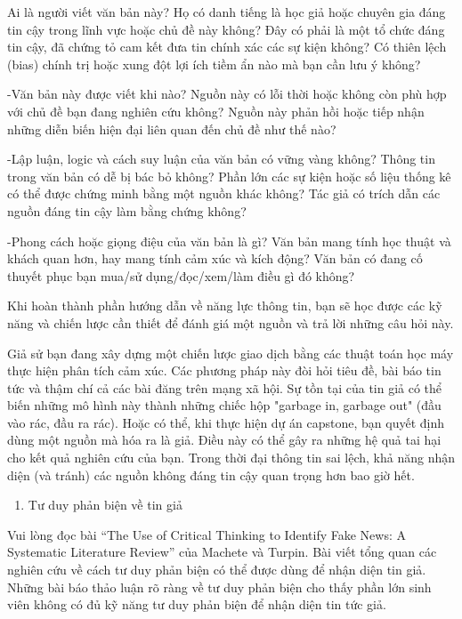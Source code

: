 Ai là người viết văn bản này? Họ có danh tiếng là học giả hoặc chuyên gia đáng tin cậy trong lĩnh vực hoặc chủ đề này không? Đây có phải là một tổ chức đáng tin cậy, đã chứng tỏ cam kết đưa tin chính xác các sự kiện không? Có thiên lệch (bias) chính trị hoặc xung đột lợi ích tiềm ẩn nào mà bạn cần lưu ý không?

-Văn bản này được viết khi nào? Nguồn này có lỗi thời hoặc không còn phù hợp với chủ đề bạn đang nghiên cứu không? Nguồn này phản hồi hoặc tiếp nhận những diễn biến hiện đại liên quan đến chủ đề như thế nào?

-Lập luận, logic và cách suy luận của văn bản có vững vàng không? Thông tin trong văn bản có dễ bị bác bỏ không? Phần lớn các sự kiện hoặc số liệu thống kê có thể được chứng minh bằng một nguồn khác không? Tác giả có trích dẫn các nguồn đáng tin cậy làm bằng chứng không?

-Phong cách hoặc giọng điệu của văn bản là gì? Văn bản mang tính học thuật và khách quan hơn, hay mang tính cảm xúc và kích động? Văn bản có đang cố thuyết phục bạn mua/sử dụng/đọc/xem/làm điều gì đó không?

Khi hoàn thành phần hướng dẫn về năng lực thông tin, bạn sẽ học được các kỹ năng và chiến lược cần thiết để đánh giá một nguồn và trả lời những câu hỏi này.

Giả sử bạn đang xây dựng một chiến lược giao dịch bằng các thuật toán học máy thực hiện phân tích cảm xúc. Các phương pháp này đòi hỏi tiêu đề, bài báo tin tức và thậm chí cả các bài đăng trên mạng xã hội. Sự tồn tại của tin giả có thể biến những mô hình này thành những chiếc hộp "garbage in, garbage out" (đầu vào rác, đầu ra rác). Hoặc có thể, khi thực hiện dự án capstone, bạn quyết định dùng một nguồn mà hóa ra là giả. Điều này có thể gây ra những hệ quả tai hại cho kết quả nghiên cứu của bạn. Trong thời đại thông tin sai lệch, khả năng nhận diện (và tránh) các nguồn không đáng tin cậy quan trọng hơn bao giờ hết.

\begin{enumerate}
\def\labelenumi{\arabic{enumi}.}
\setcounter{enumi}{3}
\item
  Tư duy phản biện về tin giả
\end{enumerate}

Vui lòng đọc bài ``The Use of Critical Thinking to Identify Fake News: A Systematic Literature Review'' của Machete và Turpin. Bài viết tổng quan các nghiên cứu về cách tư duy phản biện có thể được dùng để nhận diện tin giả. Những bài báo thảo luận rõ ràng về tư duy phản biện cho thấy phần lớn sinh viên không có đủ kỹ năng tư duy phản biện để nhận diện tin tức giả.

